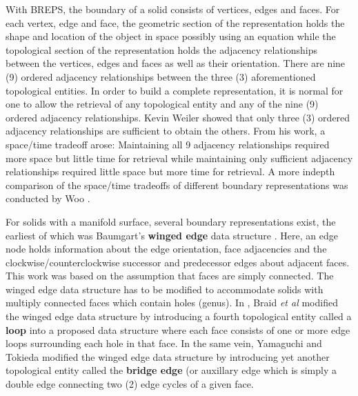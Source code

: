 \hspace{30} With   B­REPS,   the   boundary   of   a   solid   consists   of   vertices,   edges   and  
faces.   For   each   vertex,   edge   and   face,   the   geometric   section   of   the  
representation   holds   the   shape   and   location   of   the   object   in   space   possibly  
using   an   equation   while   the   topological   section   of   the   representation   holds   the  
adjacency   relationships   between   the   vertices,   edges   and   faces   as   well   as   their  
orientation.   There   are   nine   (9)   ordered   adjacency   relationships   between   the  
three   (3)   aforementioned   topological   entities.   In   order   to   build   a   complete  
representation,   it   is   normal   for   one   to   allow   the   retrieval   of   any   topological   entity  
and   any   of   the   nine   (9)   ordered   adjacency   relationships. Kevin Weiler \cite{14}  
showed   that   only   three   (3)   ordered   adjacency   relationships   are   sufficient   to  
obtain   the   others.   From   his   work, a   space/time   trade­off   arose:   Maintaining   all   9  
adjacency   relationships   required   more   space   but   little   time   for   retrieval   while  
maintaining   only   sufficient   adjacency   relationships   required   little   space   but  
more   time   for   retrieval.   A   more   indepth   comparison   of   the   space/time  
trade­offs of different boundary representations was conducted by Woo \cite{15}.  

\hspace{30} For   solids   with   a   manifold   surface,   several   boundary   representations  
exist,   the   earliest   of   which   was   Baumgart's   \textbf{winged ­edge}   data   structure   \cite{16}.  
Here,   an   edge   node   holds   information   about   the   edge   orientation,   face  
adjacencies   and   the   clockwise/counterclockwise   successor   and   predecessor  
edges   about   adjacent   faces.   This   work   was   based   on   the   assumption   that  
faces   are   simply   connected.   The   winged ­edge   data   structure   has   to   be  
modified   to   accommodate   solids   with   multiply   connected   faces   which   contain  
holes   (genus).   In   \cite{17},   Braid   \textit{et   al}   modified   the   winged ­edge   data   structure   by  
introducing   a   fourth   topological   entity   called   a   \textbf{loop}   into   a   proposed   data  
structure   where   each   face   consists   of   one   or   more   edge   loops   surrounding  
each   hole   in   that   face.   In   the   same   vein,   Yamaguchi   and   Tokieda   \cite{18}   modified  
the   winged ­edge   data   structure   by   introducing   yet   another   topological   entity  
called   the   \textbf{bridge   edge}   (or   auxillary   edge   which   is   simply   a   double   edge 
connecting two (2) edge cycles of a given face.

